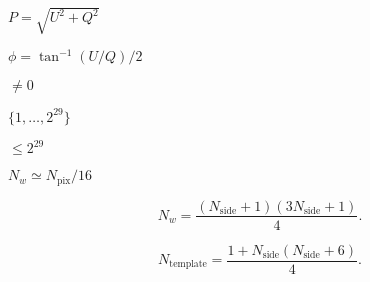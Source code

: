 \documentclass[12pt,twoside]{article}
\providecommand{\facname}{}%
\providecommand{\FACNAME}{}%
\providecommand{\projfullname}{}
\def\lthtmlcheckvsize{\ifdim\ht\sizebox<\vsize 
  \ifdim\wd\sizebox<\hsize\expandafter\hfill\fi \expandafter\vfill
  \else\expandafter\vss\fi}%
\begin{document}
{\newpage\clearpage
{}%
$P = \sqrt{U^2 + Q^2}$%
\lthtmlindisplaymathZ
\lthtmlcheckvsize\clearpage}

{\newpage\clearpage
{}%
$\phi = \tan^{-1}(U/Q) /2$%
\lthtmlindisplaymathZ
\lthtmlcheckvsize\clearpage}

{\newpage\clearpage
{}%
$\ne 0$%
\lthtmlindisplaymathZ
\lthtmlcheckvsize\clearpage}


\renewcommand{\projfullname}{{a Mollweide}}

\renewcommand{\facname}{{neighbours\_nest }}

\renewcommand{\facname}{{neighbours\_ring }}

\renewcommand{\facname}{{npix2nside }}

\renewcommand{\FACNAME}{{NPIX2NSIDE }}
{\newpage\clearpage
{}%
$\{1,\ldots,2^{29}\}$%
\lthtmlindisplaymathZ
\lthtmlcheckvsize\clearpage}


\renewcommand{\facname}{{nside2npix}}

\renewcommand{\FACNAME}{{NSIDE2NPIX }}
{\newpage\clearpage
{}%
$ \le 2^{29}$%
\lthtmlindisplaymathZ
\lthtmlcheckvsize\clearpage}


\renewcommand{\facname}{{nside2npweights }}

\renewcommand{\FACNAME}{{NSIDE2NPWEIGHTS }}
{\newpage\clearpage
{}%
$N_w  \simeq N_{\mathrm{pix}}/16$%
\lthtmlindisplaymathZ
\lthtmlcheckvsize\clearpage}

{\newpage\clearpage
{}%
\begin{displaymath}N_w=\frac{(N_{\mathrm{side}}+1)(3N_{\mathrm{side}}+1)}{4}.\end{displaymath}%
\lthtmldisplayZ
\lthtmlcheckvsize\clearpage}


\renewcommand{\facname}{{nside2ntemplates }}

\renewcommand{\FACNAME}{{NSIDE2NTEMPLATES }}
{\newpage\clearpage
{}%
\begin{displaymath}N_{\mathrm{template}}=\frac{1+N_{\mathrm{side}}(N_{\mathrm{side}}+6)}{4}.\end{displaymath}%
\lthtmldisplayZ
\lthtmlcheckvsize\clearpage}
\end{document}

